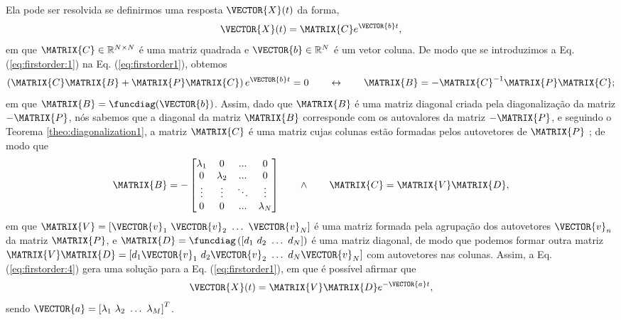 \begin{myproofT}
Ela pode ser resolvida se definirmos uma resposta $\VECTOR{X}(t)$ da forma, 
\begin{equation}\label{eq:firstorder:1}
\VECTOR{X}(t)=\MATRIX{C}e^{\VECTOR{b}t},
\end{equation}
em que $\MATRIX{C} \in \mathbb{R}^{N\times N}$ é uma matriz quadrada e $\VECTOR{b} \in \mathbb{R}^{N}$ é um vetor coluna.
De modo que se introduzimos a Eq. (\ref{eq:firstorder:1}) na Eq. (\ref{eq:firstorder1}),
obtemos 
\begin{equation}\label{eq:firstorder:2}
\left(\MATRIX{C}\MATRIX{B}+\MATRIX{P}\MATRIX{C}\right)e^{\VECTOR{b}t} = 0 
\qquad \leftrightarrow \qquad
\MATRIX{B}=-\MATRIX{C}^{-1}\MATRIX{P}\MATRIX{C};
\end{equation}
em que $\MATRIX{B}=\funcdiag(\VECTOR{b})$. 
Assim, dado que $\MATRIX{B}$ é uma matriz diagonal criada pela diagonalização da  
matriz $-\MATRIX{P}$, nós sabemos que
a diagonal da matriz $\MATRIX{B}$ corresponde com os autovalores da matriz $-\MATRIX{P}$,
e seguindo o Teorema \ref{theo:diagonalization1}, a matriz $\MATRIX{C}$ é uma matriz cujas colunas estão formadas pelos 
autovetores de $\MATRIX{P}$ \cite[pp. 67]{golub2013matrix}; de modo que
\begin{equation}\label{eq:firstorder:4}
\MATRIX{B}=-
\begin{bmatrix}
\lambda_1 & 0         & ...    & 0 \\
0         & \lambda_2 & ...    & 0 \\
\vdots    & \vdots    & \ddots & \vdots \\
0         & 0         & ...    & \lambda_N
\end{bmatrix}
\qquad \wedge \qquad 
\MATRIX{C}=\MATRIX{V}\MATRIX{D}, 
\end{equation}
em que $\MATRIX{V}=\left[ \VECTOR{v}_1~  \VECTOR{v}_2~  \dots~ \VECTOR{v}_N\right]$ 
é uma matriz formada pela agrupação dos autovetores $\VECTOR{v}_n$ da matriz $\MATRIX{P}$,
e $\MATRIX{D}=\funcdiag\left(\left[ d_1~  d_2~  \dots~ d_N\right]\right)$ 
é uma matriz diagonal, de modo que podemos formar outra matriz  
$\MATRIX{V}\MATRIX{D}=\left[ d_1\VECTOR{v}_1~  d_2\VECTOR{v}_2~  \dots~ d_N\VECTOR{v}_N\right]$
com autovetores nas colunas.
Assim, a Eq. (\ref{eq:firstorder:4}) gera uma solução para a Eq. (\ref{eq:firstorder1}),
em que é possível afirmar que
\begin{equation}\label{eq:firstorder:5}
\VECTOR{X}(t)=\MATRIX{V}\MATRIX{D} e^{-\VECTOR{a} t},
\end{equation}
sendo $\VECTOR{a}=\left[ \lambda_1~ \lambda_2~ \dots~ \lambda_M\right]^{T}$.
\end{myproofT}

